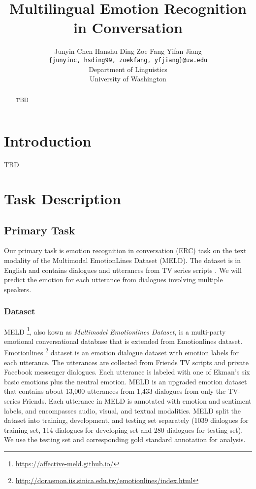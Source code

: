 \documentclass[11pt]{article}
\title{Multilingual Emotion Recognition in Conversation}
\author{Junyin Chen {} {} {} Hanshu Ding {} {} {} Zoe Fang {} {} {} Yifan Jiang \\
		\texttt{\{junyinc, hsding99, zoekfang, yfjiang\}@uw.edu} \\
        Department of Linguistics \\ University of Washington}
\begin{document}
\maketitle
\begin{abstract}
  TBD
\end{abstract}

\section{Introduction}
TBD

\section{Task Description}

\subsection{Primary Task}
\label{sect:primary_task}

Our primary task is emotion recognition in conversation (ERC) task on the text modality of the Multimodal EmotionLines Dataset (MELD). The dataset is in English and contains dialogues and utterances from TV series scripts . We will predict the emotion for each utterance from dialogues involving multiple speakers.

\subsubsection{Dataset}

MELD\citep{poria-etal-2019-meld} \footnote{\url{https://affective-meld.github.io/}}, also kown as \textit{Multimodel Emotionlines Dataset}, is a multi-party emotional conversational database that is extended from Emotionlines dataset. 
Emotionlines \citep{hsu-etal-2018-emotionlines}\footnote{\url{http://doraemon.iis.sinica.edu.tw/emotionlines/index.html}} dataset is an emotion dialogue dataset with emotion labels for each utterance. The utterances are collected from Friends TV scripts and private Facebook messenger dialogues. Each utterance is labeled with one of Ekman’s six basic emotions plus the neutral emotion. MELD is an upgraded emotion dataset that contains about 13,000 utterances from 1,433 dialogues from only the TV-series Friends. Each utterance in MELD is annotated with emotion and sentiment labels, and encompasses audio, visual, and textual modalities. 
MELD split the dataset into training, development, and testing set separately (1039 dialogues for training set, 114 dialogues for developing set and 280 dialogues for testing set). We use the testing set and corresponding gold standard annotation for analysis.
\end{document}
